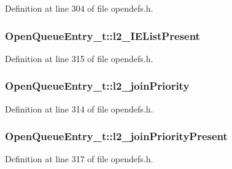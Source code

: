 Definition at line 304 of file opendefs.\+h.

\subsubsection[{\texorpdfstring{l2\+\_\+\+I\+E\+List\+Present}{l2_IEListPresent}}]{ Open\+Queue\+Entry\+\_\+t\+::l2\+\_\+\+I\+E\+List\+Present}\hypertarget{struct_open_queue_entry__t_ab7966694bfece3c655370f51ead81a68}{}\label{struct_open_queue_entry__t_ab7966694bfece3c655370f51ead81a68}


Definition at line 315 of file opendefs.\+h.

\subsubsection[{\texorpdfstring{l2\+\_\+join\+Priority}{l2_joinPriority}}]{ Open\+Queue\+Entry\+\_\+t\+::l2\+\_\+join\+Priority}\hypertarget{struct_open_queue_entry__t_a145b75208a9164110159971afc8a5f13}{}\label{struct_open_queue_entry__t_a145b75208a9164110159971afc8a5f13}


Definition at line 314 of file opendefs.\+h.

\subsubsection[{\texorpdfstring{l2\+\_\+join\+Priority\+Present}{l2_joinPriorityPresent}}]{ Open\+Queue\+Entry\+\_\+t\+::l2\+\_\+join\+Priority\+Present}\hypertarget{struct_open_queue_entry__t_a1478b0b7760cd76307c17823a8f818b3}{}\label{struct_open_queue_entry__t_a1478b0b7760cd76307c17823a8f818b3}


Definition at line 317 of file opendefs.\+h.

